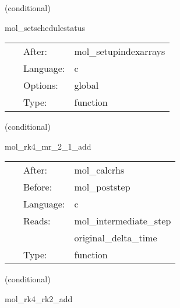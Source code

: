 \vspace{5mm}

   (conditional) 

\hspace{5mm} mol\_setschedulestatus 

\hspace{5mm}{\it set the flag so it is ok to register with mol } 


\hspace{5mm}

 \begin{tabular*}{160mm}{cll} 
~ & After:  & mol\_setupindexarrays \\ 
~ & Language:  & c \\ 
~ & Options:  & global \\ 
~ & Type:  & function \\ 
\end{tabular*} 


\vspace{5mm}

   (conditional) 

\hspace{5mm} mol\_rk4\_mr\_2\_1\_add 

\hspace{5mm}{\it updates calculated with the multirate runge-kutta 4 method } 


\hspace{5mm}

 \begin{tabular*}{160mm}{cll} 
~ & After:  & mol\_calcrhs \\ 
~ & Before:  & mol\_poststep \\ 
~ & Language:  & c \\ 
~ & Reads:  & mol\_intermediate\_step \\ 
~& ~ &original\_delta\_time\\ 
~ & Type:  & function \\ 
\end{tabular*} 


\vspace{5mm}

   (conditional) 

\hspace{5mm} mol\_rk4\_rk2\_add 

\hspace{5mm}{\it updates calculated with the multirate rk4/rk2 method } 


\hspace{5mm}

